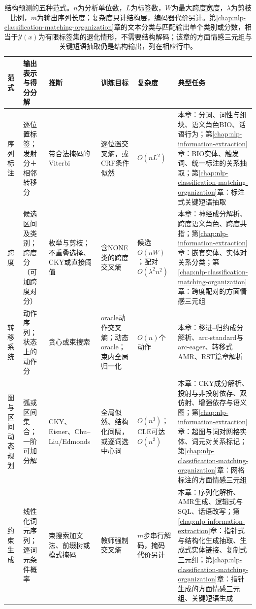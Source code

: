 \begin{table}[htbp]
  \centering
  \small
  \begin{tabularx}{\linewidth}{@{}>{\raggedright\arraybackslash}p{13mm}>{\raggedright\arraybackslash}p{26mm}>{\raggedright\arraybackslash}p{22mm}>{\raggedright\arraybackslash}p{24mm}>{\raggedright\arraybackslash}p{18mm}>{\raggedright\arraybackslash}X@{}}
    \toprule
    范式 & 输出表示与得分分解 & 推断 & 训练目标 & 复杂度 & 典型任务\\
    \midrule
    序列标注 & 逐位置标签；发射分＋相邻转移分 & 带合法掩码的Viterbi & 逐位置交叉熵，或CRF条件似然 & $O(nL^2)$ & 本章：分词、词性与组块、语义角色BIO、话语行为；第\ref{chap:nlp-information-extraction}章：BIO实体、触发词、统一标注的关系抽取；第\ref{chap:nlp-classification-matching-organization}章：标注式关键短语抽取\\
    跨度 & 候选区间及类别；跨度分（可加跨度对分） & 枚举与剪枝；不重叠选择、CKY或直接阈值 & 含NONE类的跨度交叉熵 & 候选$O(nW)$；配对$O(\lambda^2n^2)$ & 本章：神经成分解析、跨度语义角色、跨度共指；第\ref{chap:nlp-information-extraction}章：嵌套实体、实体对关系分类；第\ref{chap:nlp-classification-matching-organization}章：跨度配对的方面情感三元组\\
    转移系统 & 动作序列；状态上的动作分 & 贪心或束搜索 & oracle动作交叉熵；动态oracle；束内全局归一化 & $O(n)$个动作 & 本章：移进–归约成分解析、arc-standard与arc-eager、转移式AMR、RST篇章解析\\
    图与区间动态规划 & 弧或区间集合；一阶可加分解 & CKY、Eisner、Chu–Liu/Edmonds & 全局似然、结构化间隔，或逐词选中心词 & $O(n^3)$；CLE可达$O(n^2)$ & 本章：CKY成分解析、投射与非投射依存、双仿射、增强依存与语义图；第\ref{chap:nlp-information-extraction}章：超图与词对网格实体、词元对关系标记；第\ref{chap:nlp-classification-matching-organization}章：网格标注的方面情感三元组\\
    约束生成 & 线性化词元序列；逐词元条件概率 & 束搜索加文法、前缀树或模式掩码 & 教师强制交叉熵 & $m$步串行解码，掩码代价另计 & 本章：序列化解析、AMR生成、逻辑式与SQL、话语改写；第\ref{chap:nlp-information-extraction}章：指针式与结构化生成抽取、生成式实体链接、复制式三元组；第\ref{chap:nlp-classification-matching-organization}章：指针生成的方面情感三元组、关键短语生成\\
    \bottomrule
  \end{tabularx}
  \caption{结构预测的五种范式。$n$为分析单位数，$L$为标签数，$W$为最大跨度宽度，$\lambda$为剪枝比例，$m$为输出序列长度；复杂度只计结构层，编码器代价另计。第\ref{chap:nlp-classification-matching-organization}章的文本分类与匹配输出单个类别或分数，相当于$\mathcal Y(x)$为有限标签集的退化情形，不需要结构解码；该章的方面情感三元组与关键短语抽取仍是结构输出，列在相应行中。}
  \label{tab:nlp-analysis-paradigms}
\end{table}


